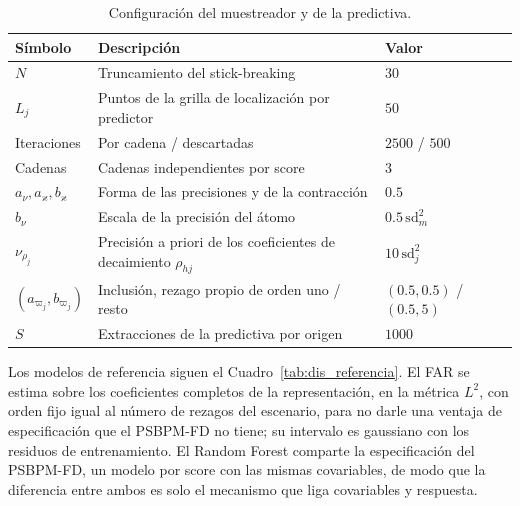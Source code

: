\begin{table}[H]
\centering\small
\caption{Configuración del muestreador y de la predictiva.}
\label{tab:dis_mcmc}
\begin{tabular}{p{} p{} p{}}
\hline
Símbolo & Descripción & Valor \\
\hline
$N$                   & Truncamiento del stick-breaking                         & $30$ \\
$L_j$                 & Puntos de la grilla de localización por predictor       & $50$ \\
Iteraciones           & Por cadena / descartadas                                & $2500$ / $500$ \\
Cadenas               & Cadenas independientes por score                        & $3$ \\
$a_\nu, a_\varkappa, b_\varkappa$ & Forma de las precisiones y de la contracción  & $0.5$ \\
$b_\nu$               & Escala de la precisión del átomo                        & $0.5\,\mathrm{sd}_m^{2}$ \\
$\nu_{\rho_j}$        & Precisión a priori de los coeficientes de decaimiento $\rho_{hj}$ & $10\,\mathrm{sd}_j^{2}$ \\
$(a_{\varpi_j}, b_{\varpi_j})$ & Inclusión, rezago propio de orden uno / resto      & $(0.5, 0.5)$ / $(0.5, 5)$ \\
$S$                   & Extracciones de la predictiva por origen                & $1000$ \\
\hline
\end{tabular}
\end{table}

Los modelos de referencia siguen el Cuadro~\ref{tab:dis_referencia}. El FAR se estima sobre los coeficientes completos de la representación, en la métrica $L^2$, con orden fijo igual al número de rezagos del escenario, para no darle una ventaja de especificación que el PSBPM-FD no tiene; su intervalo es gaussiano con los residuos de entrenamiento. El Random Forest comparte la especificación del PSBPM-FD, un modelo por score con las mismas covariables, de modo que la diferencia entre ambos es solo el mecanismo que liga covariables y respuesta.

